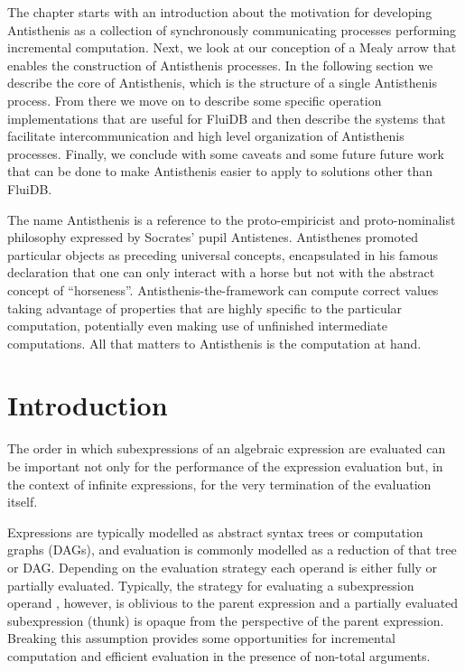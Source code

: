 The chapter starts with an introduction about the motivation for
developing Antisthenis as a collection of synchronously communicating
processes performing incremental computation. Next, we look at our
conception of a Mealy arrow that enables the construction of
Antisthenis processes. In the following section we describe the core
of Antisthenis, which is the structure of a single Antisthenis
process. From there we move on to describe some specific operation
implementations that are useful for FluiDB and then describe the
systems that facilitate intercommunication and high level organization
of Antisthenis processes. Finally, we conclude with some caveats and
some future future work that can be done to make Antisthenis easier to
apply to solutions other than FluiDB.

The name Antisthenis is a reference to the proto-empiricist 
and proto-nominalist philosophy expressed by Socrates' 
pupil Antistenes. Antisthenes promoted particular objects as 
preceding universal concepts, encapsulated in his famous
declaration that one can only interact with a horse but not 
with the abstract concept of ``horseness''. Antisthenis-the-framework can
compute correct values taking advantage of properties
that are highly specific to the particular computation, potentially
even making use of unfinished intermediate computations. 
All that matters to Antisthenis is the computation at hand.

\section{Introduction}
\label{sec:antisthenis_intro}

The order in which subexpressions of an algebraic expression are
evaluated can be important not only for the performance of the
expression evaluation but, in the context of infinite expressions, for
the very termination of the evaluation itself.

Expressions are typically modelled as abstract syntax trees or
computation graphs (DAGs), and evaluation is commonly modelled as a
reduction of that tree or DAG. Depending on the evaluation strategy
each operand is either fully or partially evaluated. Typically, the
strategy for evaluating a subexpression operand , however, is
oblivious to the parent expression and a partially evaluated
subexpression (thunk) is opaque from the perspective of the parent
expression. Breaking this assumption provides some opportunities for
incremental computation and efficient evaluation in the presence of
non-total arguments.

